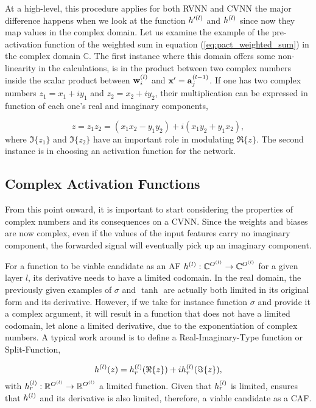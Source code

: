At a high-level, this procedure applies for both \gls{RVNN} and \gls{CVNN} the major difference happens when we look at the function $ h'^{(l)} $ and $ h^{(l)} $ since now they map values in the complex domain. Let us examine the example of the pre-activation function of the weighted sum in equation (\ref{eq:pact_weighted_sum}) in the complex domain $ \mathbb{C} $. The first instance where this domain offers some non-linearity in the calculations, is in the product between two complex numbers inside the scalar product between $ \mathbf{w}^{(l)}_{i} $ and $ \mathbf{x}' = \mathbf{a}^{(l-1)}_{j} $.  If one has two complex numbers $ z_1 = x_1 + iy_1 $ and $ z_2 = x_2 + iy_2 $, their multiplication can be expressed in function of each one's real and imaginary components,

\begin{equation}
	z = z_1 z_2 = ( x_1 x_2 - y_1 y_2 ) + i( x_1 y_2 + y_1 x_2 ),
\end{equation}
where $\Im\{ z_1 \} $ and $\Im\{ z_2 \} $ have an important role in modulating $ \Re\{ z \} $. The second instance is in choosing an activation function for the network.

\subsection{Complex Activation Functions}
From this point onward, it is important to start considering the properties of complex numbers and its consequences on a \gls{CVNN}. Since the weights and biases are now complex, even if  the values of the input features carry no imaginary component, the forwarded signal will eventually pick up an imaginary component.

For a function to be viable candidate as an \gls{AF} $ h^{(l)}: \mathbb{C}^{O^{(l)}} \rightarrow \mathbb{C}^{O^{(l)}} $ for a given layer $ l $, its derivative needs to have a limited codomain. In the real domain, the previously given examples of $ \sigma $ and $ \tanh $ are actually both limited in its original form and its derivative. However, if we take for instance function $ \sigma $ and provide it a complex argument, it will result in a function that does not have a limited codomain, let alone a limited derivative, due to the exponentiation of complex numbers. A typical work around is to define a Real-Imaginary-Type function or Split-Function,

\begin{equation}
	h^{(l)}(z) = h^{(l)}_{r}(\Re\{ z \}) + i h^{(l)}_{r}(\Im\{ z \}),
	\label{eq:split_func}
\end{equation}
with $ h^{(l)}_{r}:  \mathbb{R}^{O^{(l)}} \rightarrow \mathbb{R}^{O^{(l)}} $ a limited function. Given that $ h^{(l)}_{r} $ is limited, ensures that  $ h^{(l)} $ and its derivative is also limited, therefore, a viable candidate as a \gls{CAF}.


